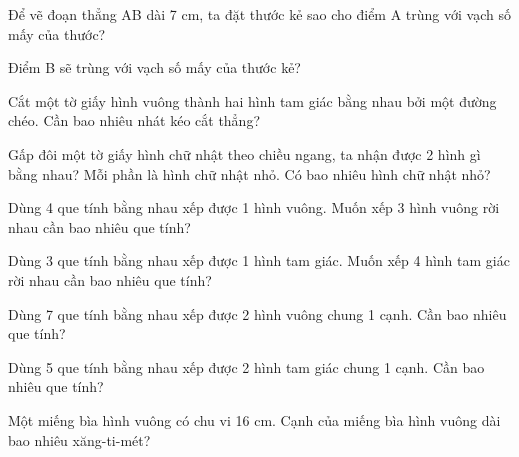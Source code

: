 \begin{ex}
Để vẽ đoạn thẳng AB dài 7 cm, ta đặt thước kẻ sao cho điểm A trùng với vạch số mấy của thước?
\end{ex}

\begin{ex}
Điểm B sẽ trùng với vạch số mấy của thước kẻ?
\end{ex}

\begin{ex}
Cắt một tờ giấy hình vuông thành hai hình tam giác bằng nhau bởi một đường chéo. Cần bao nhiêu nhát kéo cắt thẳng?
\end{ex}

\begin{ex}
Gấp đôi một tờ giấy hình chữ nhật theo chiều ngang, ta nhận được 2 hình gì bằng nhau? Mỗi phần là hình chữ nhật nhỏ. Có bao nhiêu hình chữ nhật nhỏ?
\end{ex}

\begin{ex}
Dùng 4 que tính bằng nhau xếp được 1 hình vuông. Muốn xếp 3 hình vuông rời nhau cần bao nhiêu que tính?
\end{ex}

\begin{ex}
Dùng 3 que tính bằng nhau xếp được 1 hình tam giác. Muốn xếp 4 hình tam giác rời nhau cần bao nhiêu que tính?
\end{ex}

\begin{ex}
Dùng 7 que tính bằng nhau xếp được 2 hình vuông chung 1 cạnh. Cần bao nhiêu que tính?
\end{ex}

\begin{ex}
Dùng 5 que tính bằng nhau xếp được 2 hình tam giác chung 1 cạnh. Cần bao nhiêu que tính?
\end{ex}

\begin{ex}
Một miếng bìa hình vuông có chu vi 16 cm. Cạnh của miếng bìa hình vuông dài bao nhiêu xăng-ti-mét?
\end{ex}

